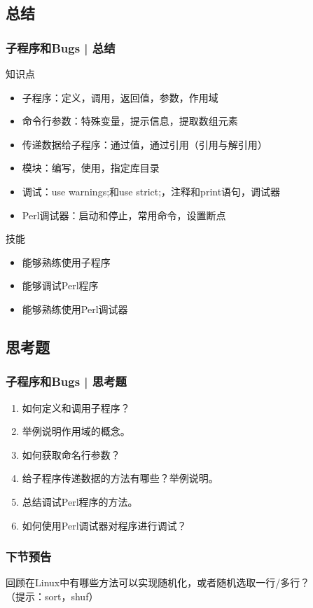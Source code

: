 \subsection{总结}
\begin{frame}
  \frametitle{子程序和Bugs | 总结}
  \begin{block}{知识点}
    \begin{itemize}
      \item 子程序：定义，调用，返回值，参数，作用域
      \item 命令行参数：特殊变量，提示信息，提取数组元素
      \item 传递数据给子程序：通过值，通过引用（引用与解引用）
      \item 模块：编写，使用，指定库目录
      \item 调试：use warnings;和use strict;，注释和print语句，调试器
      \item Perl调试器：启动和停止，常用命令，设置断点
    \end{itemize}
  \end{block}
  \pause
  \begin{block}{技能}
    \begin{itemize}
      \item 能够熟练使用子程序
      \item 能够调试Perl程序
      \item 能够熟练使用Perl调试器
    \end{itemize}
  \end{block}
\end{frame}

\subsection{思考题}
\begin{frame}
  \frametitle{子程序和Bugs | 思考题}
  \begin{enumerate}
    \item 如何定义和调用子程序？
    \item 举例说明作用域的概念。
    \item 如何获取命名行参数？
    \item 给子程序传递数据的方法有哪些？举例说明。
    \item 总结调试Perl程序的方法。
    \item 如何使用Perl调试器对程序进行调试？
  \end{enumerate}
\end{frame}

\begin{frame}
  \frametitle{下节预告}
  回顾在Linux中有哪些方法可以实现随机化，或者随机选取一行/多行？\\
  （提示：sort，shuf）
\end{frame}


